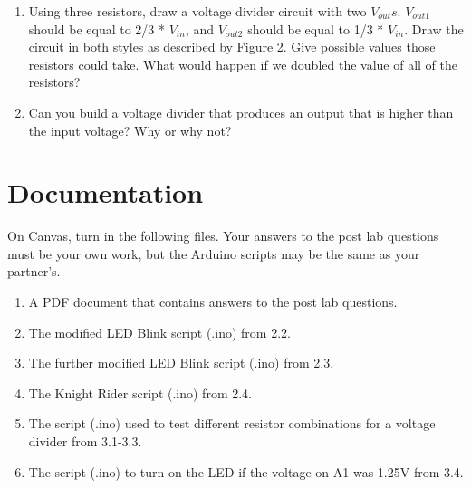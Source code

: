 \documentclass[12pt]{article}
\begin{document}
\begin{enumerate}
		\item Using three resistors, draw a voltage divider circuit with two $V_{out}s$. $V_{out1}$ should be equal to 2/3 * $V_{in}$, and $V_{out2}$ should be equal to  1/3 * $V_{in}$. Draw the circuit in both styles as described by Figure 2. Give possible values those resistors could take. What would happen if we doubled the value of all of the resistors? 
		
		\item Can you build a voltage divider that produces an output that is higher than the input voltage? Why or why not?
		
		
	\end{enumerate}

    
    \section*{Documentation}
    On Canvas, turn in the following files. Your answers to the post lab questions must be your own work, but the Arduino scripts may be the same as your partner's.
    \begin{enumerate}
        \item A PDF document that contains answers to the post lab questions.
        \item The modified LED Blink script (.ino) from 2.2.
        \item The further modified LED Blink script (.ino) from 2.3.
        \item The Knight Rider script (.ino) from 2.4.
        \item The script (.ino) used to test different resistor combinations for a voltage divider from 3.1-3.3.
        \item The script (.ino) to turn on the LED if the voltage on A1 was 1.25V from 3.4.
    \end{enumerate}
\end{document}
